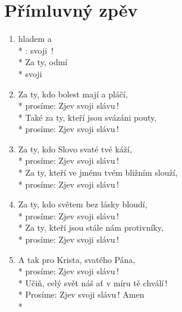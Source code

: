 \section{Přímluvný zpěv}
\begin{enumerate}
\item {}  hladem  a \\*
:  svoji \,! \\*
Za ty,     odmí \\*                                                %
  svoji  
\item Za ty, kdo bolest mají a pláčí,\\*
prosíme: Zjev svoji slávu\,!\\*
Také za ty, kteří jsou svázáni pouty,\\*
prosíme: Zjev svoji slávu\,!
\item Za ty, kdo Slovo svaté tvé káží,\\*
prosíme: Zjev svoji slávu\,!\\*
Za ty, kteří ve jménu tvém bližním slouží,\\*
prosíme: Zjev svoji slávu\,!
\item Za ty, kdo světem bez lásky bloudí,\\*
prosíme: Zjev svoji slávu\,!\\*
Za ty, kteří jsou stále nám protivníky,\\*
prosíme: Zjev svoji slávu\,!
\item A tak pro Krista, svatého Pána,\\*
prosíme: Zjev svoji slávu\,!\\*
Učiň, celý svět náš ať v míru tě chválí\,!\\*
Prosíme: Zjev svoji slávu\,! Amen\\*
\end{enumerate}
